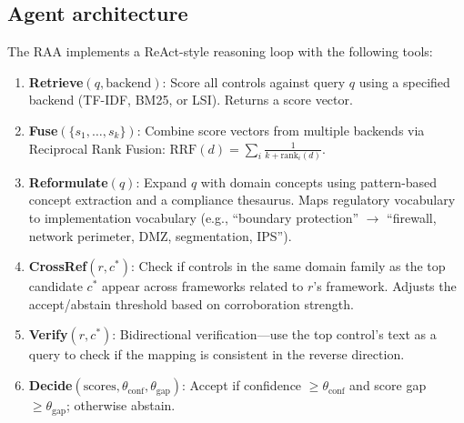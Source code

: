 \documentclass{sn-jnl}
\begin{document}
\subsection{Agent architecture}
The RAA implements a ReAct-style reasoning loop with the following tools:

\begin{enumerate}
\item \textbf{Retrieve}$(q, \text{backend})$: Score all controls against query $q$ using a specified backend (TF-IDF, BM25, or LSI). Returns a score vector.
\item \textbf{Fuse}$(\{s_1, \ldots, s_k\})$: Combine score vectors from multiple backends via Reciprocal Rank Fusion: $\text{RRF}(d) = \sum_i \frac{1}{k + \text{rank}_i(d)}$.
\item \textbf{Reformulate}$(q)$: Expand $q$ with domain concepts using pattern-based concept extraction and a compliance thesaurus. Maps regulatory vocabulary to implementation vocabulary (e.g., ``boundary protection'' $\rightarrow$ ``firewall, network perimeter, DMZ, segmentation, IPS'').
\item \textbf{CrossRef}$(r, c^*)$: Check if controls in the same domain family as the top candidate $c^*$ appear across frameworks related to $r$'s framework. Adjusts the accept/abstain threshold based on corroboration strength.
\item \textbf{Verify}$(r, c^*)$: Bidirectional verification---use the top control's text as a query to check if the mapping is consistent in the reverse direction.
\item \textbf{Decide}$(\text{scores}, \theta_{\text{conf}}, \theta_{\text{gap}})$: Accept if confidence $\geq \theta_{\text{conf}}$ and score gap $\geq \theta_{\text{gap}}$; otherwise abstain.
\end{enumerate}
\end{document}
